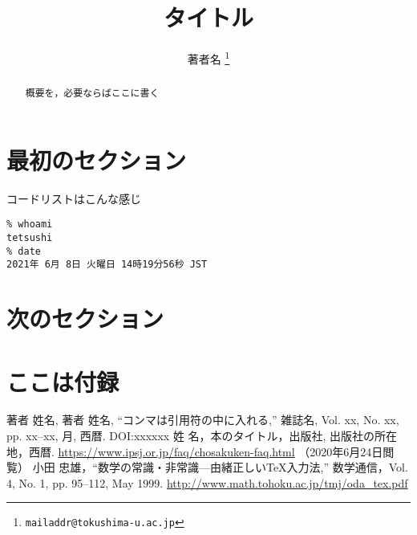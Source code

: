 \documentclass[a4j]{jsarticle}
\title{\textbf{タイトル}}
\author{著者名 \thanks{\texttt{mailaddr@tokushima-u.ac.jp}}}
\begin{document}
\maketitle

\begin{abstract}
概要を，必要ならばここに書く
\end{abstract}


\section{最初のセクション}

コードリストはこんな感じ
\begin{lstlisting}
% whoami
tetsushi
% date
2021年 6月 8日 火曜日 14時19分56秒 JST
\end{lstlisting}

\section{次のセクション}

\appendix 

\section{ここは付録}

\begin{thebibliography}{9}
著者 姓名, 著者 姓名,
``コンマは引用符の中に入れる,''
雑誌名,
Vol. xx, No. xx, pp. xx--xx, 月, 西暦. 
DOI:xxxxxx
%
姓 名，本のタイトル，出版社, 出版社の所在地，西暦.
%
\url{https://www.ipsj.or.jp/faq/chosakuken-faq.html}
（2020年6月24日閲覧）
%
小田 忠雄，``数学の常識・非常識---由緒正しい\TeX 入力法,''
数学通信，Vol. 4, No. 1, pp. 95--112, May 1999.
\url{http://www.math.tohoku.ac.jp/tmj/oda_tex.pdf}
%
\end{thebibliography}

%
%
\end{document}
